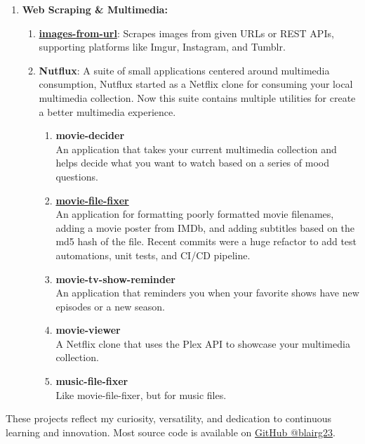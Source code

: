 \documentclass[oneside]{article}%
\begin{document}
\begin{enumerate}[]
\begin{enumerate}[]
			\normalsize
			\item \textbf{Web Scraping \& Multimedia:}
			\small
				\begin{enumerate}[-]
					\item \textbf{\href{https://github.com/blairg23/images-from-url}{images-from-url}}: Scrapes images from given URLs or REST APIs, supporting platforms like Imgur, Instagram, and Tumblr.
					\item \textbf{Nutflux}: A suite of small applications centered around multimedia consumption, Nutflux\textsuperscript{\textcopyright} started as a Netflix clone for consuming your local multimedia collection. Now this suite contains multiple utilities for create a better multimedia experience.
						\begin{enumerate}[]
							\item \textbf{movie-decider}\\
								An application that takes your current multimedia collection and helps decide what you want to watch based on a series of mood questions.
							\item  \textbf{\href{https://github.com/blairg23/movie-file-fixer}{movie-file-fixer}}\\
								An application for formatting poorly formatted movie filenames, adding a movie poster from IMDb, and adding subtitles based on the md5 hash of the file. Recent commits were a huge refactor to add test automations, unit tests, and CI/CD pipeline.
							\item \textbf{movie-tv-show-reminder}\\
								An application that reminders you when your favorite shows have new episodes or a new season.
							\item \textbf{movie-viewer}\\
								A Netflix clone that uses the Plex API to showcase your multimedia collection.
							\item \textbf{music-file-fixer}\\
								Like movie-file-fixer, but for music files.
						\end{enumerate}
				\end{enumerate}
	
	\end{enumerate}
			These projects reflect my curiosity, versatility, and dedication to continuous learning and innovation. Most source code is available on \href{https://github.com/blairg23}{GitHub @blairg23}.

\end{enumerate}
\end{document}
